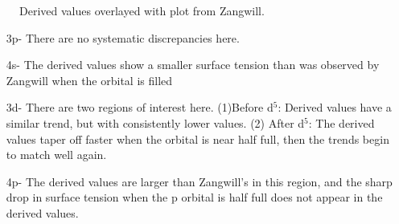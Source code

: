 \documentclass[12pt]{article}
\renewcommand{\=}[1]{\stackrel{#1}{=}} %
\theoremstyle{definition}
\theoremstyle{remark}
\begin{document}
\begin{figure}[H]
	\centering
	\caption{Derived values overlayed with plot from Zangwill.}
	\label{overlay}
\end{figure}

\newpage
\begin{itemize}
\item[3p-] There are no systematic discrepancies here.
\item[4s-] The derived values show a smaller surface tension than was observed by Zangwill when the orbital is filled
\item[3d-]There are two regions of interest here. (1)Before d$^5$: Derived values have a similar trend, but with consistently lower values. (2) After d$^5$: The derived values taper off faster when the orbital is near half full, then the trends begin to match well again.
\item[4p-]The derived values are larger than Zangwill's in this region, and the sharp drop in surface tension when the p orbital is half full does not appear in the derived values.
\end{itemize}
\end{document}
